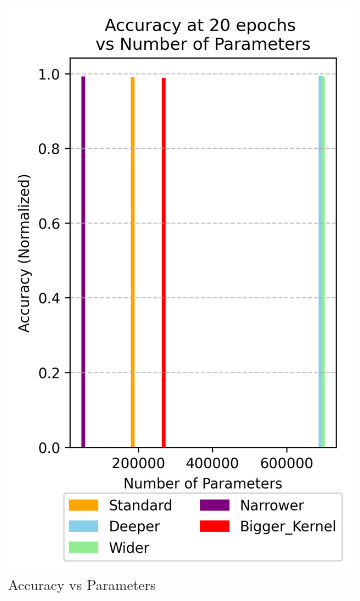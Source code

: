 \documentclass{article}
\begin{document}
\begin{figure}[h!]
    \centering
    \begin{subfigure}[t]{0.3\textwidth}
        \centering
        \includegraphics[width=\textwidth]{./plots/plot13.png}
        \caption{Accuracy vs Parameters}
        \label{fig:plot16a}
    \end{subfigure}
    \hspace{0.01\textwidth}
    \begin{subfigure}[t]{0.3\textwidth}
        \centering

\end{subfigure}
\end{figure}
\end{document}
